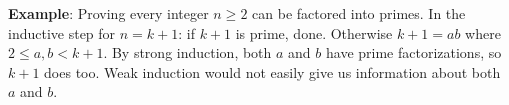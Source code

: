 \documentclass[11pt]{article}
\begin{document}
\begin{enumerate}[label=\textbf{\arabic*.}]
  \textbf{Example}: Proving every integer $n \geq 2$ can be factored into primes. In the inductive 
  step for $n = k+1$: if $k+1$ is prime, done. Otherwise $k+1 = ab$ where $2 \leq a, b < k+1$. By 
  strong induction, both $a$ and $b$ have prime factorizations, so $k+1$ does too. Weak induction 
  would not easily give us information about both $a$ and $b$.

\end{enumerate}
\end{document}
